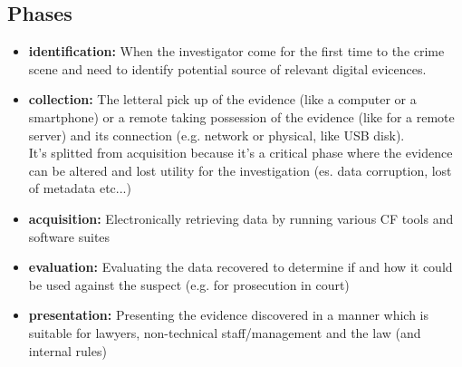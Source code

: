 \subsection{Phases}

\begin{itemize}[itemsep=0pt]
  \item \textbf{identification:} When the investigator come for the first time to the crime scene and need to identify potential source of relevant digital evicences.

  \item \textbf{collection:} The letteral pick up of the evidence (like a computer or a smartphone) or a remote taking possession of the evidence (like for a remote server) and its connection (e.g. network or physical, like USB disk). \\ It's splitted from acquisition because it's a critical phase where the evidence can be altered and lost utility for the investigation (es. data corruption, lost of metadata etc...)

  \item \textbf{acquisition:} Electronically retrieving data by running various CF tools and software suites

  \item \textbf{evaluation:} Evaluating the data recovered to determine if and how it could be used against the suspect (e.g. for prosecution in court)

  \item \textbf{presentation:} Presenting the evidence discovered in a manner which is suitable for lawyers, non-technical staff/management and the law (and internal rules)
\end{itemize}

